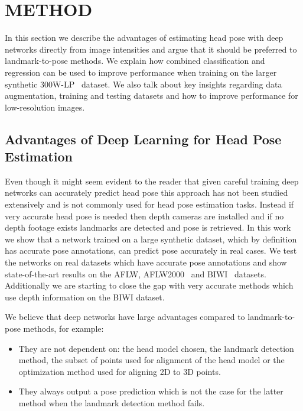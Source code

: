 \documentclass[10pt,twocolumn,letterpaper]{article}
\begin{document}
\section{METHOD}\label{sec3}

In this section we describe the advantages of estimating head pose with deep networks directly from image intensities and argue that it should be preferred to landmark-to-pose methods. We explain how combined classification and regression can be used to improve performance when training on the larger synthetic 300W-LP~\cite{zhu2016face} dataset. We also talk about key insights regarding data augmentation, training and testing datasets and how to improve performance for low-resolution images.

\subsection{Advantages of Deep Learning for Head Pose Estimation}\label{sec3-A}

Even though it might seem evident to the reader that given careful training deep networks can accurately predict head pose this approach has not been studied extensively and is not commonly used for head pose estimation tasks. Instead if very accurate head pose is needed then depth cameras are installed and if no depth footage exists landmarks are detected and pose is retrieved. In this work we show that a network trained on a large synthetic dataset, which by definition has accurate pose annotations, can predict pose accurately in real cases. We test the networks on real datasets which have accurate pose annotations and show state-of-the-art results on the AFLW, AFLW2000~\cite{zhu2016face} and BIWI~\cite{fanelli_IJCV} datasets. Additionally we are starting to close the gap with very accurate methods which use depth information on the BIWI dataset.

We believe that deep networks have large advantages compared to landmark-to-pose methods, for example:
\begin{itemize}
\itemsep0em 
  \item They are not dependent on: the head model chosen, the landmark detection method, the subset of points used for alignment of the head model or the optimization method used for aligning 2D to 3D points.
  
  \item They always output a pose prediction which is not the case for the latter method when the landmark detection method fails. \end{itemize}
\end{document}
